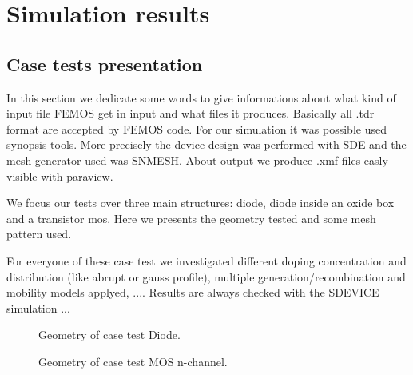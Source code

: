 \chapter{Simulation results}


\section{Case tests presentation}

In this section we dedicate some words to give informations about what kind of input file FEMOS get in input and what files it produces.
Basically all .tdr format are accepted by FEMOS code. For our simulation it was possible used synopsis tools. More precisely the device design was performed with SDE and the mesh generator used 
was SNMESH. About output we produce .xmf files easly visible with paraview.

 We focus our tests over three main structures: diode, diode inside an oxide box and a transistor mos.  
Here we presents the geometry tested and some mesh pattern used.

\begin{figure}[!h]
\end{figure}

 For everyone of these case test we investigated different doping concentration and distribution (like abrupt or gauss profile), multiple generation/recombination and mobility models applyed, ....
Results are always checked with the SDEVICE simulation ...

\clearpage


\begin{figure}[!h]
\centering
{}
\hspace{2.5cm}
\caption{Geometry of case test Diode.}
\end{figure}

\begin{figure}[!h]
\centering
{}
\hspace{1.5cm}
\caption{Geometry of case test MOS n-channel.}
\end{figure}
